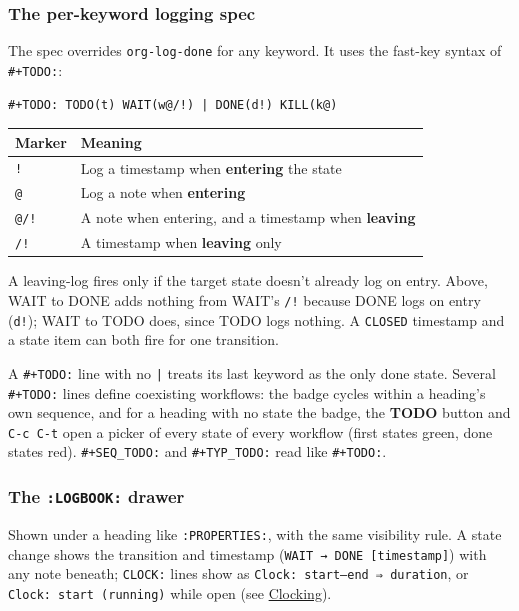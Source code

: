 \documentclass[11pt]{article}
\begin{document}
\subsubsection{The per-keyword logging spec}
\label{sec:org100b286}

The spec overrides \texttt{org-log-done} for any keyword. It uses the fast-key syntax of \texttt{\#+TODO:}:

\begin{verbatim}
#+TODO: TODO(t) WAIT(w@/!) | DONE(d!) KILL(k@)
\end{verbatim}

\begin{center}
\begin{tabular}{ll}
Marker & Meaning\\[0pt]
\hline
\texttt{!} & Log a timestamp when \textbf{entering} the state\\[0pt]
\texttt{@} & Log a note when \textbf{entering}\\[0pt]
\texttt{@/!} & A note when entering, and a timestamp when \textbf{leaving}\\[0pt]
\texttt{/!} & A timestamp when \textbf{leaving} only\\[0pt]
\end{tabular}
\end{center}

A leaving-log fires only if the target state doesn't already log on entry. Above, WAIT to DONE adds nothing from WAIT's \texttt{/!} because DONE logs on entry (\texttt{d!}); WAIT to TODO does, since TODO logs nothing. A \texttt{CLOSED} timestamp and a state item can both fire for one transition.

A \texttt{\#+TODO:} line with no \texttt{|} treats its last keyword as the only done state. Several \texttt{\#+TODO:} lines define coexisting workflows: the badge cycles within a heading's own sequence, and for a heading with no state the badge, the \textbf{TODO} button and \texttt{C-c C-t} open a picker of every state of every workflow (first states green, done states red). \texttt{\#+SEQ\_TODO:} and \texttt{\#+TYP\_TODO:} read like \texttt{\#+TODO:}.

\subsubsection{The \texttt{:LOGBOOK:} drawer}
\label{sec:orgb9cbc85}

Shown under a heading like \texttt{:PROPERTIES:}, with the same visibility rule. A state change shows the transition and timestamp (\texttt{WAIT → DONE   [timestamp]}) with any note beneath; \texttt{CLOCK:} lines show as \texttt{Clock: start–end ⇒ duration}, or \texttt{Clock: start (running)} while open (see \hyperref[sec:org6e1340d]{Clocking}).
\end{document}
